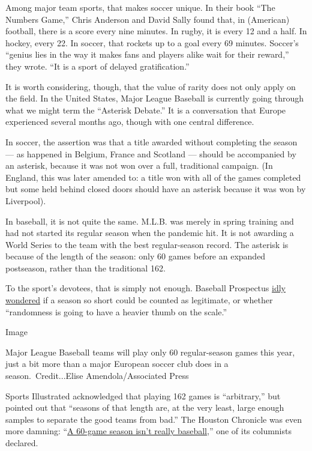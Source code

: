 Among major team sports, that makes soccer unique. In their book ``The
Numbers Game,'' Chris Anderson and David Sally found that, in (American)
football, there is a score every nine minutes. In rugby, it is every 12
and a half. In hockey, every 22. In soccer, that rockets up to a goal
every 69 minutes. Soccer's ``genius lies in the way it makes fans and
players alike wait for their reward,'' they wrote. ``It is a sport of
delayed gratification.''

It is worth considering, though, that the value of rarity does not only
apply on the field. In the United States, Major League Baseball is
currently going through what we might term the ``Asterisk Debate.'' It
is a conversation that Europe experienced several months ago, though
with one central difference.

In soccer, the assertion was that a title awarded without completing the
season --- as happened in Belgium, France and Scotland --- should be
accompanied by an asterisk, because it was not won over a full,
traditional campaign. (In England, this was later amended to: a title
won with all of the games completed but some held behind closed doors
should have an asterisk because it was won by Liverpool).

In baseball, it is not quite the same. M.L.B. was merely in spring
training and had not started its regular season when the pandemic hit.
It is not awarding a World Series to the team with the best
regular-season record. The asterisk is because of the length of the
season: only 60 games before an expanded postseason, rather than the
traditional 162.

To the sport's devotees, that is simply not enough. Baseball Prospectus
\href{https://www.baseballprospectus.com/news/article/59712/baseball-therapy-how-legitimate-is-a-60-game-season/}{idly
wondered} if a season so short could be counted as legitimate, or
whether ``randomness is going to have a heavier thumb on the scale.''

Image

Major League Baseball teams will play only 60 regular-season games this
year, just a bit more than a major European soccer club does in a
season.~Credit...Elise Amendola/Associated Press

Sports Illustrated acknowledged that playing 162 games is ``arbitrary,''
but pointed out that ``seasons of that length are, at the very least,
large enough samples to separate the good teams from bad.'' The Houston
Chronicle was even more damning:
``\href{https://www.houstonchronicle.com/texas-sports-nation/brian-t-smith/article/Smith-60-games-an-MLB-sham-You-bet-your-asterisk-15347892.php}{A
60-game season isn't really baseball},'' one of its columnists declared.

